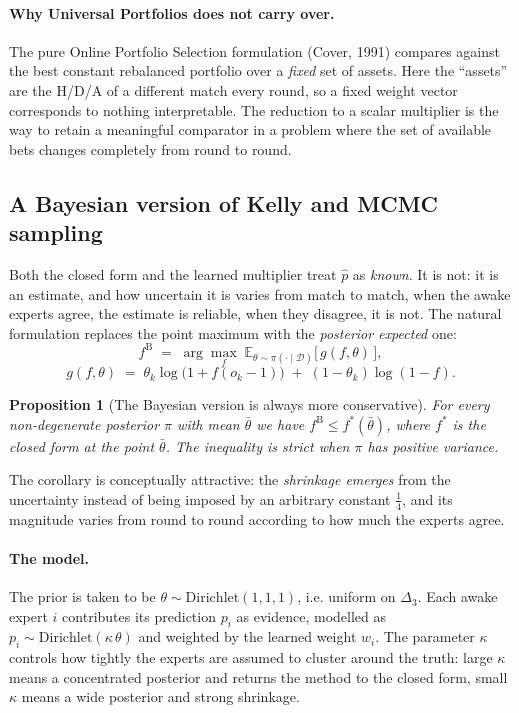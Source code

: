 \documentclass[12pt,a4paper,oneside]{report}
\renewcommand{\_}{\oldunderscore\allowbreak}
\theoremstyle{definition}
\theoremstyle{plain}
\newtheorem{proposition}[theorem]{Proposition}
\theoremstyle{remark}
\begin{document}
\paragraph{Why Universal Portfolios does not carry over.} The pure Online Portfolio Selection
formulation (Cover, 1991) compares against the best constant rebalanced portfolio over a
\emph{fixed} set of assets. Here the ``assets'' are the H/D/A of a different match every round,
so a fixed weight vector corresponds to nothing interpretable. The reduction to a scalar
multiplier is the way to retain a meaningful comparator in a problem where the set of available
bets changes completely from round to round.

\subsection{A Bayesian version of Kelly and MCMC sampling}
\label{sec:mcmc-theory}

Both the closed form and the learned multiplier treat $\hat{p}$ as \emph{known}. It is not: it is
an estimate, and how uncertain it is varies from match to match, when the awake experts agree,
the estimate is reliable, when they disagree, it is not. The natural formulation replaces the
point maximum with the \emph{posterior expected} one: \[ f^{\mathrm{B}} \;=\; \arg\max_{f} \;
\mathbb{E}_{\theta \sim \pi(\cdot\mid\mathcal{D})} \big[\, g(f,\theta) \,\big], \] \[
g(f,\theta) \;=\; \theta_k \log\big(1+f(o_k-1)\big) \;+\; (1-\theta_k)\log(1-f). \]

\begin{proposition}[The Bayesian version is always more conservative]
\label{prop:bayes-conservative}
For every non-degenerate posterior $\pi$ with mean $\bar{\theta}$ we have
$f^{\mathrm{B}} \leq f^{*}(\bar{\theta})$, where $f^{*}$ is the closed form at the point
$\bar{\theta}$. The inequality is strict when $\pi$ has positive variance.
\end{proposition}

The corollary is conceptually attractive: the \emph{shrinkage emerges} from the uncertainty
instead of being imposed by an arbitrary constant $\tfrac14$, and its magnitude varies from round
to round according to how much the experts agree.

\paragraph{The model.} The prior is taken to be $\theta \sim \mathrm{Dirichlet}(1,1,1)$, i.e.
uniform on $\Delta_3$. Each awake expert $i$ contributes its prediction $p_i$ as evidence,
modelled as $p_i \sim \mathrm{Dirichlet}(\kappa\,\theta)$ and weighted by the learned weight
$w_i$. The parameter $\kappa$ controls how tightly the experts are assumed to cluster around the
truth: large $\kappa$ means a concentrated posterior and returns the method to the closed form,
small $\kappa$ means a wide posterior and strong shrinkage.
\end{document}
